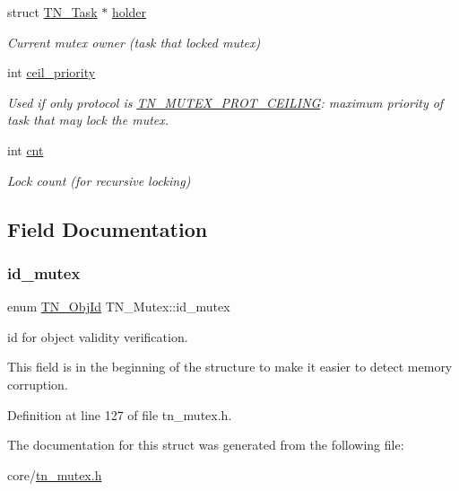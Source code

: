 \begin{DoxyCompactItemize}
\mbox{\label{structTN__Mutex_ae182682fa0d571716d03ce13e667254c}} 
struct \hyperlink{structTN__Task}{T\+N\+\_\+\+Task} $\ast$ \hyperlink{structTN__Mutex_ae182682fa0d571716d03ce13e667254c}{holder}
\begin{DoxyCompactList}\small\item\em Current mutex owner (task that locked mutex) \end{DoxyCompactList}\item 
\mbox{\label{structTN__Mutex_a98bfc437aae2a8841fd5538f2b0c2618}} 
int \hyperlink{structTN__Mutex_a98bfc437aae2a8841fd5538f2b0c2618}{ceil\+\_\+priority}
\begin{DoxyCompactList}\small\item\em Used if only protocol is {\ttfamily \hyperlink{tn__mutex_8h_a11357f7bb31a3b380cbe94e0913a5b40a8edebcfa37593a4d2d541954ce3aea67}{T\+N\+\_\+\+M\+U\+T\+E\+X\+\_\+\+P\+R\+O\+T\+\_\+\+C\+E\+I\+L\+I\+NG}}\+: maximum priority of task that may lock the mutex. \end{DoxyCompactList}\item 
\mbox{\label{structTN__Mutex_a7c367d7a5c5d8a640fd00b1fe4c9d461}} 
int \hyperlink{structTN__Mutex_a7c367d7a5c5d8a640fd00b1fe4c9d461}{cnt}
\begin{DoxyCompactList}\small\item\em Lock count (for recursive locking) \end{DoxyCompactList}\end{DoxyCompactItemize}


\subsection{Field Documentation}
\mbox{\label{structTN__Mutex_a09b2fb7b45cab984dd3db1c9d1d3b5b4}} 
\subsubsection{\texorpdfstring{id\+\_\+mutex}{id\_mutex}}
{\footnotesize\ttfamily enum \hyperlink{tn__common_8h_ae779dd1f6735f6e139fb70acd004d976}{T\+N\+\_\+\+Obj\+Id} T\+N\+\_\+\+Mutex\+::id\+\_\+mutex}



id for object validity verification. 

This field is in the beginning of the structure to make it easier to detect memory corruption. 

Definition at line 127 of file tn\+\_\+mutex.\+h.



The documentation for this struct was generated from the following file\+:\begin{DoxyCompactItemize}
\item 
core/\hyperlink{tn__mutex_8h}{tn\+\_\+mutex.\+h}\end{DoxyCompactItemize}
